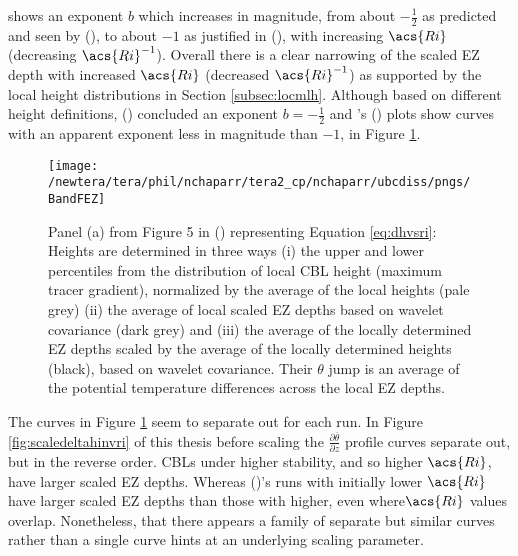 shows an exponent $b$ which increases in magnitude, from about $-\frac{1}{2}$ as predicted and seen by \citeauthor{Boers89} (\citeyear{Boers89}), to about $-1$ as justified in \citeauthor{StullNelEl} (\citeyear{StullNelEl}),  with increasing $\acs{Ri}$ (decreasing $\acs{Ri}^{-1}$).  Overall there is a clear narrowing of the scaled \acs{EZ} depth with increased $\acs{Ri}$ (decreased $\acs{Ri}^{-1}$) as supported by the local height distributions in Section \ref{subsec:locmlh}.  Although based on different height definitions, \citeauthor{FedConzMir04} (\citeyear{FedConzMir04}) concluded an exponent $b = -\frac{1}{2}$ and \citeauthor{BrooksFowler2}'s (\citeyear{BrooksFowler2}) plots show curves with an apparent exponent less in magnitude than $-1$, in Figure \ref{fig:BandFEZ}. \\

\begin{figure}[htbp]
    \centering
    \texttt{[image: /newtera/tera/phil/nchaparr/tera2\_cp/nchaparr/ubcdiss/pngs/BandFEZ]}
    \caption[Relationship of Scaled \acs{EZ} depth to Richardson number from \citeauthor{BrooksFowler2}'s (\citeyear{BrooksFowler2})]{Panel (a) from Figure 5 in \citeauthor{BrooksFowler2} (\citeyear{BrooksFowler2}) representing Equation \ref{eq:dhvsri}: Heights are determined in three ways (i) the upper and lower percentiles from the distribution of local \acs{CBL} height (maximum tracer gradient), normalized by the average of the local heights (pale grey) (ii) the average of local scaled \acs{EZ} depths based on wavelet covariance (dark grey) and (iii) the average of the locally determined \acs{EZ} depths scaled by the average of the locally determined heights (black), based on wavelet covariance.  Their $\theta$ jump is an average of the potential temperature differences across the local \acs{EZ} depths.}
    \label{fig:BandFEZ}   %
\end{figure}

The curves in Figure \ref{fig:BandFEZ} seem to separate out for each run.  In Figure \ref{fig:scaledeltahinvri} of this thesis before scaling the $\frac{\partial \overline{\theta}}{\partial z}$ profile curves separate out, but in the reverse order.  \acs{CBL}s under higher stability, and so higher $\acs{Ri}$, have larger scaled \acs{EZ} depths.  Whereas \citeauthor{BrooksFowler2} (\citeyear{BrooksFowler2})'s runs with initially lower $\acs{Ri}$ have larger scaled \acs{EZ} depths than those with higher, even where$\acs{Ri}$ values overlap. Nonetheless, that there appears a family of separate but similar curves rather than a single curve hints at an underlying scaling parameter.\\     

